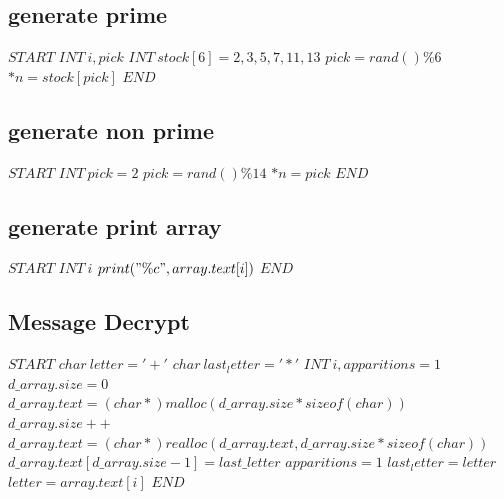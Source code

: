 \documentclass[12]{article}
\begin{document}
\subsection{generate prime} 

\begin{algorithmic}[1] 
\STATE $START$ 
\STATE $ INT \ i, pick$ 
\STATE $ INT \ stock[6] = {2,3,5,7,11,13} $ 
\STATE $ pick = rand() \% 6 $  
\STATE $*n = stock[pick]$ 
\STATE $END$
\end{algorithmic} 




\subsection{generate non prime} 

\begin{algorithmic}[1] 
\STATE $START$  
\STATE $INT \ pick=2 $ 
    \STATE $pick = rand()\%14$ 
\ENDWHILE 
\STATE $*n = pick$ 
\STATE $END$
\end{algorithmic} 


\subsection{generate print array} 
\begin{algorithmic}[1] 
\STATE $START$
\STATE $INT \ i$ 
\STATE $print("\%c", array.text[i])$   
\ENDFOR
\STATE $END$
\end{algorithmic} 


\subsection{Message Decrypt} 
\begin{algorithmic}[1] 
\STATE $START$
\STATE $char \ letter = '+'$
\STATE $char \ last_letter = '*'$
\STATE $INT \ i, apparitions = 1 $  
\STATE $d \_array.size = 0$
\STATE $d \_array.text = (char *) malloc(d\_array.size * sizeof(char))$ 
                \STATE $d \_array.size++$
                \STATE $d \_array.text = (char *)realloc( d \_array.text, d \_array.size * sizeof(char) )$
                \STATE $d \_array.text[d \_array.size - 1] = last \_letter$ 
        \ENDIF 
    \STATE $apparitions = 1$
    \STATE $last_letter = letter$
    \STATE $letter = array.text[i]$ 
    \ENDIF 
\ENDFOR 
\STATE$END$
\end{algorithmic}  
\end{document}

